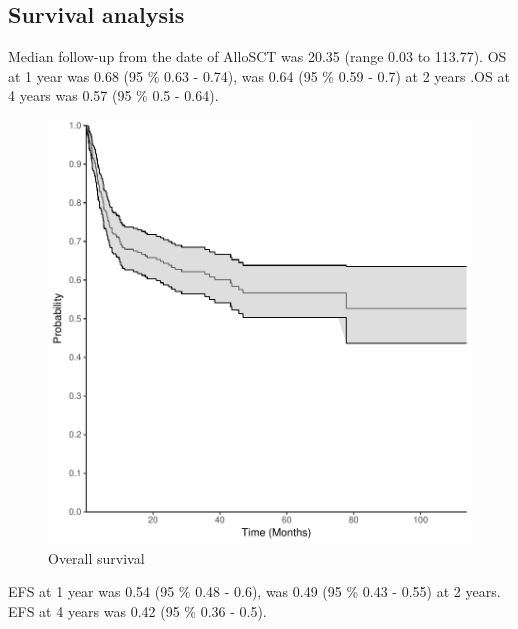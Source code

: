 \documentclass[a4paper,11pt] {article}
\begin{document}
\subsection{Survival analysis}
Median follow-up from the date of AlloSCT was 20.35 (range 0.03 to 113.77). OS at 1 year was 0.68 (95 \% 0.63 - 0.74), was 0.64 (95 \% 0.59 - 0.7) at 2 years
.OS at 4 years was 0.57 (95 \% 0.5 - 0.64).
\begin{figure}[h]
\begin{center}
\includegraphics{Rapport-fig1}
\end{center}
\caption{Overall survival}
\label{fig1}
\end{figure}

\pagebreak
EFS at 1 year was 0.54 (95 \% 0.48 - 0.6), was 0.49 (95 \% 0.43 - 0.55) at 2 years. EFS at 4 years was 0.42 (95 \% 0.36 - 0.5).
\end{document}
